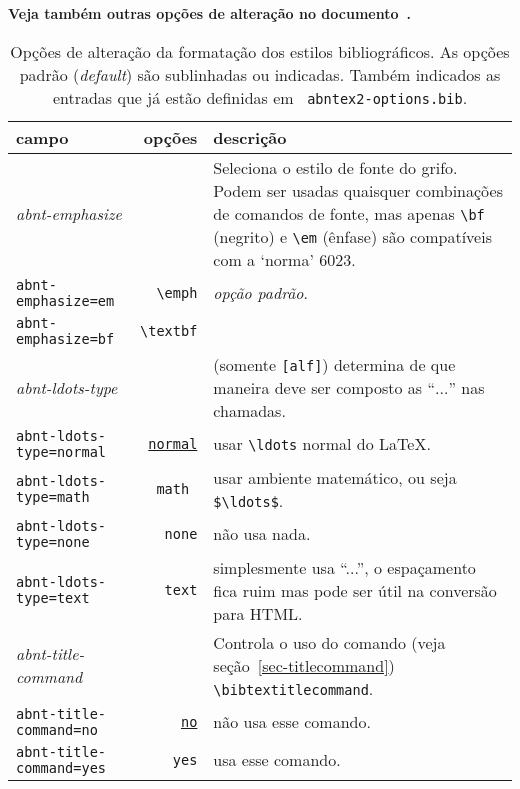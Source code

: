 \documentclass[a4paper]{ltxdoc}
\begin{document}
{\bf Veja também outras opções de alteração no
documento~.}

\begin{table}[htbp]

\caption[Opções de alteração dos estilos bibliográficos: formatação]{
Opções de alteração da formatação dos estilos bibliográficos.
As opções padrão (\emph{default}) são sublinhadas ou indicadas.
Também indicados as entradas que já estão definidas em {\tt
abntex2-options.bib}.}
\label{tabela-opcoes-formatacao}

\begin{center}
\begin{tabular}{lrp{6cm}}\hline\hline
campo & opções & descrição \\ \hline
\emph{abnt-emphasize} & & Seleciona o estilo de fonte do grifo.
Podem ser usadas quaisquer combinações de comandos de fonte, mas apenas
\verb+\bf+ (negrito) e \verb+\em+ (ênfase) são compatíveis com a `norma' 6023.
\\
{\tt abnt-emphasize=em} & \verb+\emph+ & {\em opção padrão}.  \\
{\tt abnt-emphasize=bf} & \verb+\textbf+ &
\\ \hline
\emph{abnt-ldots-type} && (somente {\tt [alf]}) determina de que maneira deve
ser composto as ``$\ldots$'' nas chamadas. \\
{\tt abnt-ldots-type=normal} & \underline{\tt normal} & usar \verb+\ldots+ normal do \LaTeX.\\
{\tt abnt-ldots-type=math} & \tt math & usar ambiente matemático, ou seja
\verb+$\ldots$+.\\
{\tt abnt-ldots-type=none} & {\tt none} & não usa nada.\\
{\tt abnt-ldots-type=text} & {\tt text} & simplesmente usa ``...'', o espaçamento
fica ruim mas pode ser útil na conversão para HTML.
\\ \hline
\emph{abnt-title-command} && Controla o uso do comando (veja
seção~\ref{sec-titlecommand}) \verb+\bibtextitlecommand+. \\
{\tt abnt-title-command=no} & \underline{\tt no} & não usa esse comando.\\
{\tt abnt-title-command=yes} & {\tt yes} & usa esse comando.
\\ \hline\hline
\end{tabular}
\end{center}
\end{table}
\end{document}
